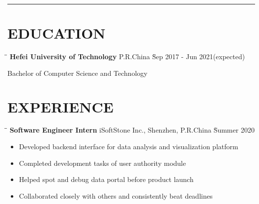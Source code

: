 \documentclass{res}
\begin{document}
 


\address{(86) 132-2563-9753 $\|$ \href{mailto:wangtzuhsiang@gmail.com}{wangtzuhsiang@gmail.com} 
        $\|$ \href{https://www.linkedin.com/in/zixiangwang/}{LinkedIn} 
        $\|$ \href{https://github.com/DolorHunter}{GitHub} 
        $\|$ \href{https://dolorhunter.com}{Blog}}

\begin{resume}

\vspace{-12pt}
\noindent\rule[0.25\baselineskip]{\textwidth}{1pt}    
\vspace{-20pt}  

\vspace{-0.1in}
\section{EDUCATION} 
    \vspace{-0.1in}	 
    \begin{tabbing}
    \hspace{3in}\= \hspace{2in}\= \kill %
    {\bf Hefei University of Technology} \>P.R.China \` Sep 2017 - Jun 2021(expected)
    \end{tabbing}\vspace{-20pt}      %
    Bachelor of Computer Science and Technology        

\vspace{-0.12in}
\section{EXPERIENCE}
    \vspace{-0.1in}	
    \begin{tabbing}
    \hspace{2.3in}\= \hspace{2.6in}\= \kill %
    {\bf Software Engineer Intern} \>iSoftStone Inc., Shenzhen, P.R.China    \` Summer 2020\\
    \end{tabbing}\vspace{-20pt}      %
    \vspace{-0.02in}
    \begin{itemize} \itemsep -2pt %
    \item Developed backend interface for data analysis and
                     visualization platform
    \item Completed development tasks of user authority module 
    \item Helped spot and debug data portal before product launch
    \item Collaborated closely with others and consistently beat deadlines
    \end{itemize}
   

\end{resume}
\end{document}
